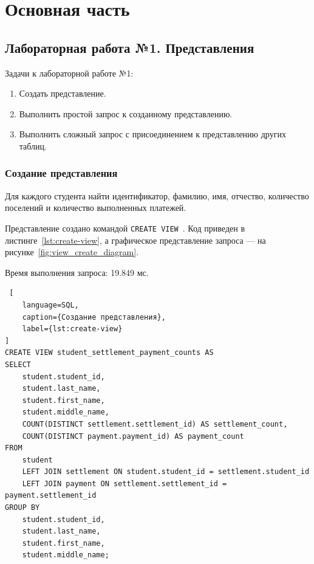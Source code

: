 
\newpage
\section{Основная часть}
\subsection{Лабораторная работа №1. Представления}
Задачи к лабораторной работе №1:
\begin{enumerate}
    \item Создать представление.
    \item Выполнить простой запрос к созданному представлению.
    \item Выполнить сложный запрос с присоединением к представлению других таблиц.
\end{enumerate}

\subsubsection{Создание представления}

Для каждого студента найти идентификатор, фамилию, имя, отчество, количество поселений и количество выполненных платежей. 

Представление создано командой \texttt{CREATE VIEW}~\cite{pg-create-view}. Код приведен в листинге~\ref{lst:create-view}, а графическое представление запроса --- на рисунке~\ref{fig:view_create_diagram}.

Время выполнения запроса: 19.849 мс.

\begin{lstlisting} [
    language=SQL,
    caption={Создание представления},
    label={lst:create-view}
]
CREATE VIEW student_settlement_payment_counts AS
SELECT
    student.student_id,
    student.last_name,
    student.first_name,
    student.middle_name,
    COUNT(DISTINCT settlement.settlement_id) AS settlement_count,
    COUNT(DISTINCT payment.payment_id) AS payment_count
FROM
    student
    LEFT JOIN settlement ON student.student_id = settlement.student_id
    LEFT JOIN payment ON settlement.settlement_id = payment.settlement_id
GROUP BY
    student.student_id,
    student.last_name,
    student.first_name,
    student.middle_name;
\end{lstlisting}

